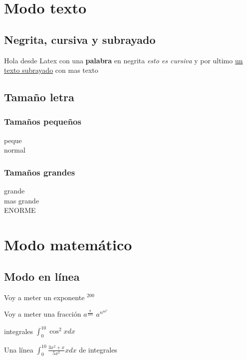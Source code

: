 \documentclass[10pt, a4paper]{report}
\begin{document}
\pagebreak
\tableofcontents
\pagebreak

\chapter{Modo texto}

\section{Negrita, cursiva y subrayado}

Hola desde Latex con
una {\bf palabra} en negrita
{\it esto es cursiva} y
por ultimo
\underline {un texto subrayado} con mas texto

\section{Tamaño letra}

\subsection{Tamaños pequeños}
{\tiny peque \\}
{\normalsize normal \\}
\subsection{Tamaños grandes}
{\large grande \\}
{\LARGE mas grande \\}
{\Huge ENORME \\}

\chapter{Modo matemático}

\section{Modo en línea}

Voy a meter un exponente $^{200} $

Voy a meter una fracción $ a^{\frac{8}{100}} $
$ a^{n^{m^{p}}} $

integrales $ \int_{0}^{10} \cos^2 x dx $

Una línea $ \int_{0}^{10} \frac{3x^2+x}{5x^2} x dx $ de integrales
\end{document}
